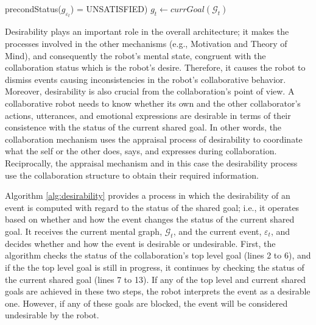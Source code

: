 \documentclass{aamas2016}
\begin{document}
\begin{algorithm}
\begin{algorithmic}[1]
{{{					precondStatus($\mathit{g}_{\varepsilon_t}$)}} =
					{\fontsize{7}{8}\selectfont UNSATISFIED})} 
						\State {}
						\Statex
						\State $\mathit{g}_{t} \gets \textit{currGoal}{(\mathcal{G}_{t})}$
						\Statex
							\State {}
							\State {}
						\EndIf
					\EndIf
				\EndIf
			\EndIf
		\EndFunction
	\end{algorithmic}
\end{algorithm}

Desirability plays an important role in the overall architecture; it makes the
processes involved in the other mechanisms (e.g., Motivation and Theory of
Mind), and consequently the robot's mental state, congruent with the
collaboration status which is the robot's desire. Therefore, it causes the robot
to dismiss events causing inconsistencies in the robot's collaborative behavior.
Moreover, desirability is also crucial from the collaboration's point of view. A
collaborative robot needs to know whether its own and the other collaborator's
actions, utterances, and emotional expressions are desirable in terms of their
consistence with the status of the current shared goal. In other words, the
collaboration mechanism uses the appraisal process of desirability to coordinate
what the self or the other does, says, and expresses during collaboration.
Reciprocally, the appraisal mechanism and in this case the desirability process
use the collaboration structure to obtain their required information.

Algorithm \ref{alg:desirability} provides a process in which the desirability of
an event is computed with regard to the status of the shared goal; i.e., it
operates based on whether and how the event changes the status of the current
shared goal. It receives the current mental graph, $\mathcal{G}_{t}$, and the
current event, $\varepsilon_t$, and decides whether and how the event is
desirable or undesirable. First, the algorithm checks the status of the
collaboration's top level goal (lines 2 to 6), and if the the top level goal is
still in progress, it continues by checking the status of the current shared
goal (lines 7 to 13). If any of the top level and current shared goals are
achieved in these two steps, the robot interprets the event as a desirable one.
However, if any of these goals are blocked, the event will be considered
undesirable by the robot.
\end{document}
